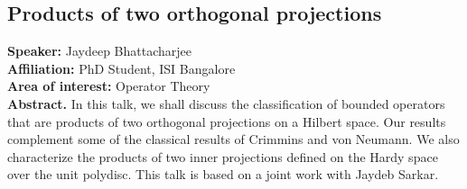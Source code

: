 
\subsection*{Products of two orthogonal projections} %
\noindent
\textbf{Speaker:} Jaydeep Bhattacharjee\\ %
\textbf{Affiliation:} PhD Student, ISI Bangalore \\ %
\textbf{Area of interest:} Operator Theory \\

\noindent\textbf{Abstract.} In this talk, we shall discuss the classification of bounded operators that are products of two orthogonal projections on a Hilbert space. Our results complement some of the classical results of Crimmins and von Neumann. We also characterize the products of two inner projections defined on the Hardy space over the unit polydisc. This talk is based on a joint work with Jaydeb Sarkar.

